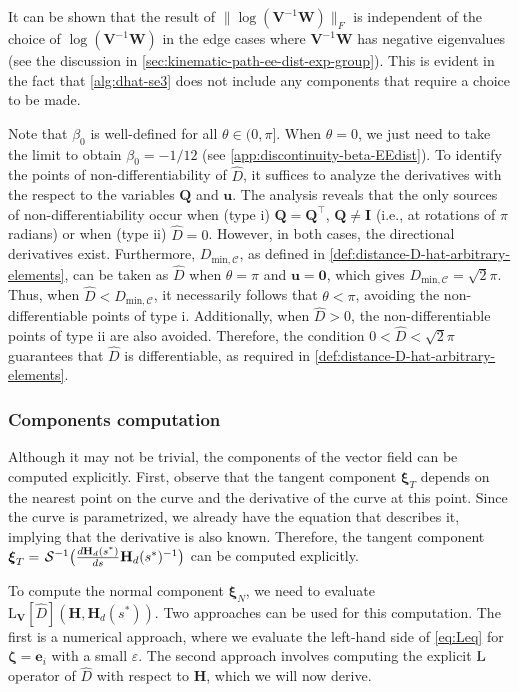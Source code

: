 It can be shown that the result of $\|\log(\mathbf{V}^{-1}\mathbf{W})\|_F$ is independent of the choice of $\log(\mathbf{V}^{-1}\mathbf{W})$ in the edge cases where $\mathbf{V}^{-1}\mathbf{W}$ has negative eigenvalues (see the discussion in \cref{sec:kinematic-path-ee-dist-exp-group}). This is evident in the fact that \cref{alg:dhat-se3} does not include any components that require a choice to be made.

Note that $\beta_0$ is well-defined for all $\theta \in (0,\pi]$. When $\theta=0$, we just need to take the limit to obtain $\beta_0=-1/12$ (see \cref{app:discontinuity-beta-EEdist}). To identify the points of non-differentiability of $\widehat{D}$, it suffices to analyze the derivatives with the respect to the variables $\mathbf{Q}$ and $\mathbf{u}$. The analysis reveals that the only sources of non-differentiability occur when (type i) $\mathbf{Q}=\mathbf{Q}^\top$, $\mathbf{Q} \not= \mathbf{I}$ (i.e., at rotations of $\pi$ radians) or when (type ii) $\widehat{D}=0$. However, in both cases, the directional derivatives exist. Furthermore, $D_{\text{min},\mathcal{C}}$, as defined in \cref{def:distance-D-hat-arbitrary-elements}, can be taken as $\widehat{D}$ when $\theta = \pi$  and $\mathbf{u} = \mathbf{0}$, which gives $D_{\text{min},\mathcal{C}} = \sqrt{2}\pi$. Thus, when $\widehat{D} < D_{\text{min},\mathcal{C}}$, it necessarily follows that $\theta < \pi$, avoiding the non-differentiable points of type i. Additionally, when $\widehat{D} > 0$, the non-differentiable points of type ii are also avoided. Therefore, the condition $0 < \widehat{D} < \sqrt{2}\pi$ guarantees that $\widehat{D}$ is differentiable, as required in \cref{def:distance-D-hat-arbitrary-elements}.
\subsubsection{Components computation}
Although it may not be trivial, the components of the vector field can be computed explicitly. First, observe that the tangent component $\boldsymbol{\xi}_T$ depends on the nearest point on the curve and the derivative of the curve at this point. Since the curve is parametrized, we already have the equation that describes it, implying that the derivative is also known. Therefore, the tangent component $\boldsymbol{\xi}_T = \invSL\bigl(\frac{d\mathbf{H}_d(s^*)}{ds}\mathbf{H}_d(s^*)^{-1}\bigr)$ can be computed explicitly.

To compute the normal component $\boldsymbol{\xi}_N$, we need to evaluate $\text{L}_{\mathbf{V}}[\widehat{D}](\mathbf{H}, \mathbf{H}_d(s^*))$. Two approaches can be used for this computation. The first is a numerical approach, where we evaluate the left-hand side of \eqref{eq:Leq} for $\boldsymbol{\zeta} = \mathbf{e}_i$ with a small $\varepsilon$. The second approach involves computing the explicit $\operatorname{L}$ operator of $\widehat{D}$ with respect to $\mathbf{H}$, which we will now derive.

